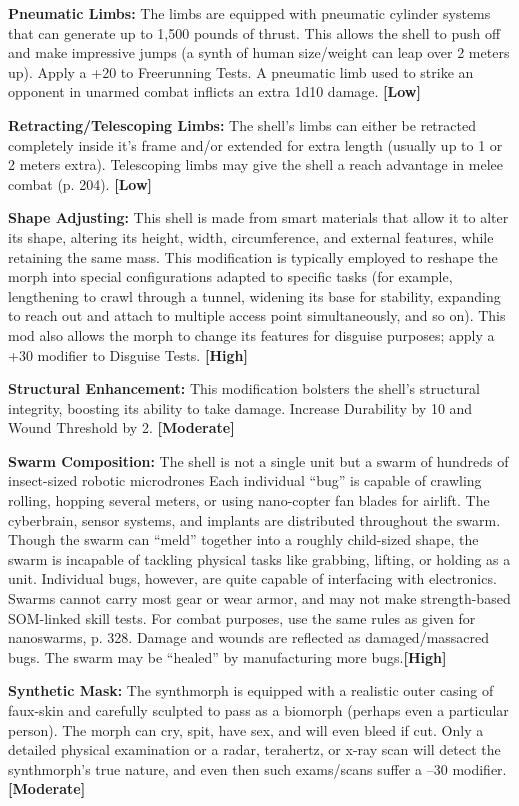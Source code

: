 \textbf{Pneumatic Limbs:} The limbs are equipped with 
pneumatic cylinder systems that can generate up to 
1,500 pounds of thrust. This allows the shell to push 
off and make impressive jumps (a synth of human 
size/weight can leap over 2 meters up). Apply a +20 to 
Freerunning Tests. A pneumatic limb used to strike an 
opponent in unarmed combat inflicts an extra 1d10 
damage. \textbf{[Low]}

\textbf{Retracting/Telescoping Limbs:} The shell's limbs can 
either be retracted completely inside it's frame and/or 
extended for extra length (usually up to 1 or 2 meters 
extra). Telescoping limbs may give the shell a reach 
advantage in melee combat (p. 204). \textbf{[Low]}

\textbf{Shape Adjusting:} This shell is made from smart 
materials that allow it to alter its shape, altering its 
height, width, circumference, and external features, 
while retaining the same mass. This modification is 
typically employed to reshape the morph into special 
configurations adapted to specific tasks (for example, 
lengthening to crawl through a tunnel, widening its 
base for stability, expanding to reach out and attach 
to multiple access point simultaneously, and so on). 
This mod also allows the morph to change its features 
for disguise purposes; apply a +30 modifier to Disguise
Tests. \textbf{[High]}

\textbf{Structural Enhancement:} This modification bolsters 
the shell's structural integrity, boosting its ability to 
take damage. Increase Durability by 10 and Wound 
Threshold by 2. \textbf{[Moderate]}

\textbf{Swarm Composition:} The shell is not a single unit 
but a swarm of hundreds of insect-sized robotic microdrones
Each individual ``bug'' is capable of crawling
rolling, hopping several meters, or using nano-copter
fan blades for airlift. The cyberbrain, sensor
systems, and implants are distributed throughout the 
swarm. Though the swarm can ``meld'' together into 
a roughly child-sized shape, the swarm is incapable of 
tackling physical tasks like grabbing, lifting, or holding
as a unit. Individual bugs, however, are quite capable
of interfacing with electronics. Swarms cannot
carry most gear or wear armor, and may not make 
strength-based SOM-linked skill tests. For combat 
purposes, use the same rules as given for nanoswarms, 
p. 328. Damage and wounds are reflected as damaged/massacred
bugs. The swarm may be ``healed'' by
manufacturing more bugs.\textbf{[High]}

\textbf{Synthetic Mask:} The synthmorph is equipped 
with a realistic outer casing of faux-skin and carefully
sculpted to pass as a biomorph (perhaps even a
particular person). The morph can cry, spit, have sex, 
and will even bleed if cut. Only a detailed physical 
examination or a radar, terahertz, or x-ray scan will 
detect the synthmorph's true nature, and even then 
such exams/scans suffer a –30 modifier. \textbf{[Moderate]}

